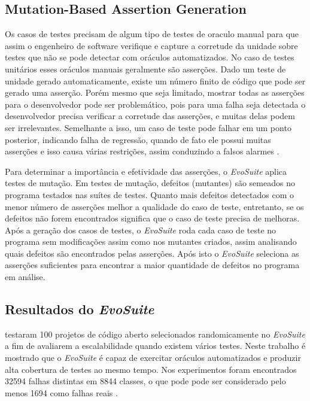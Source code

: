 \documentclass[12pt,a4paper]{article}
\begin{document}
\subsection{Mutation-Based Assertion Generation}

Os casos de testes precisam de algum tipo de testes de oraculo manual para que assim o engenheiro de software verifique e capture a corretude da unidade sobre testes que não se pode detectar com oráculos automatizados. No caso de testes unitários esses oráculos manuais geralmente são asserções. Dado um teste de unidade gerado automaticamente, existe um número finito de código que pode ser gerado uma asserção. Porém mesmo que seja limitado, mostrar todas as asserções para o desenvolvedor pode ser problemático, pois para uma falha seja detectada o desenvolvedor precisa verificar a corretude das asserções, e muitas delas podem ser irrelevantes. Semelhante a isso, um caso de teste pode falhar em um ponto posterior, indicando falha de regressão, quando de fato ele possui muitas asserções e isso causa várias restrições, assim conduzindo a falsos alarmes \cite{fraser2011evosuite}.

Para determinar a importância e efetividade das asserções, o \textit{EvoSuite} aplica testes de mutação. Em testes de mutação, defeitos (mutantes) são semeados no programa testados nas suítes de testes. Quanto mais defeitos detectados com o menor número de asserções melhor a qualidade do caso de teste, entretanto, se os defeitos não forem encontrados significa que o caso de teste precisa de melhoras. Após a geração dos casos de testes, o \textit{EvoSuite} roda cada caso de teste no programa sem modificações assim como nos mutantes criados, assim analisando quais defeitos são encontrados pelas asserções. Após isto o \textit{EvoSuite} seleciona as asserções suficientes para encontrar a maior quantidade de defeitos no programa em análise.

\subsection{Resultados do \textit{EvoSuite}}

\citeauthor{fraser20151600} testaram 100 projetos de código aberto selecionados randomicamente no \textit{EvoSuite} a fim de avaliarem a escalabilidade quando existem vários testes. Neste trabalho é mostrado que o \textit{EvoSuite} é capaz de exercitar oráculos automatizados e produzir alta cobertura de testes ao mesmo tempo. Nos experimentos foram encontrados 32594 falhas distintas em 8844 classes, o que pode pode ser considerado pelo menos 1694 como falhas reais \cite{fraser20151600}.
\end{document}
